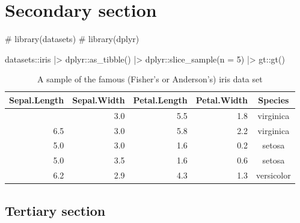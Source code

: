 \documentclass[
12pt,
openright,
oneside,
a4paper,
chapter=TITLE,
section=TITLE,
french,
spanish,
brazil,
english
]{abntex2}\usepackage{array}
\newenvironment{Shaded}{\begin{snugshade}}{\end{snugshade}}
\newcommand{\AttributeTok}[1]{\textcolor[rgb]{0.40,0.45,0.13}{#1}}
\newcommand{\CommentTok}[1]{\textcolor[rgb]{0.37,0.37,0.37}{#1}}
\newcommand{\DecValTok}[1]{\textcolor[rgb]{0.68,0.00,0.00}{#1}}
\newcommand{\FunctionTok}[1]{\textcolor[rgb]{0.28,0.35,0.67}{#1}}
\newcommand{\NormalTok}[1]{\textcolor[rgb]{0.00,0.23,0.31}{#1}}
\newcommand{\SpecialCharTok}[1]{\textcolor[rgb]{0.37,0.37,0.37}{#1}}
\begin{document}
\hypertarget{secondary-section}{%
\section{Secondary section}\label{secondary-section}}

\begin{Shaded}
\begin{Highlighting}[numbers=left,,]
\CommentTok{\# library(datasets)}
\CommentTok{\# library(dplyr)}

\NormalTok{datasets}\SpecialCharTok{::}\NormalTok{iris }\SpecialCharTok{|\textgreater{}}
\NormalTok{  dplyr}\SpecialCharTok{::}\FunctionTok{as\_tibble}\NormalTok{() }\SpecialCharTok{|\textgreater{}}
\NormalTok{  dplyr}\SpecialCharTok{::}\FunctionTok{slice\_sample}\NormalTok{(}\AttributeTok{n =} \DecValTok{5}\NormalTok{) }\SpecialCharTok{|\textgreater{}}
\NormalTok{  gt}\SpecialCharTok{::}\FunctionTok{gt}\NormalTok{()}
\end{Highlighting}
\end{Shaded}

\hypertarget{tbl-iris}{}
\begin{longtable}{rrrrc}
\caption{\label{tbl-iris}A sample of the famous (Fisher's or Anderson's) iris data set }\tabularnewline

\toprule
Sepal.Length & Sepal.Width & Petal.Length & Petal.Width & Species \\ 
\midrule\addlinespace[2.5pt]
6.5 & 3.0 & 5.5 & 1.8 & virginica \\ 
6.5 & 3.0 & 5.8 & 2.2 & virginica \\ 
5.0 & 3.0 & 1.6 & 0.2 & setosa \\ 
5.0 & 3.5 & 1.6 & 0.6 & setosa \\ 
6.2 & 2.9 & 4.3 & 1.3 & versicolor \\ 
\bottomrule
\end{longtable}

\hypertarget{tertiary-section}{%
\subsection{Tertiary section}\label{tertiary-section}}
\end{document}
